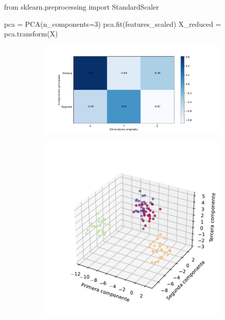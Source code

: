 \begin{mypython}[float={h},caption={Realizar un PCA.}]
  from sklearn.preprocessing import StandardScaler

  pca = PCA(n_components=3)
  pca.fit(features_scaled)
  X_reduced = pca.transform(X)
\end{mypython}
\begin{figure}[]
  \centering
  \begin{subfigure}{\textwidth}
    \centering
    \includegraphics[width=\textwidth]{figures/pca-color-ponderation.pdf}
    \caption{}
    \label{fig:pca-color-ponderation}
  \end{subfigure}
  \begin{subfigure}{0.45\textwidth}
    \centering
    \includegraphics[width=\textwidth]{figures/pca-3d-labeled.pdf}

\end{subfigure}
\end{figure}
